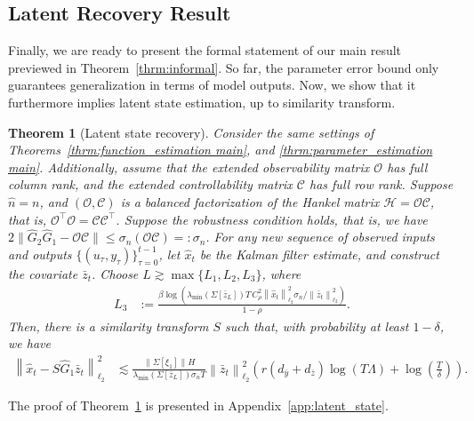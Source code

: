 \documentclass[11pt]{article}
\newtheorem{theorem}{Theorem}
\newcommand{\ybar}{\bar{y}}
\newcommand{\zbar}{\bar{z}}
\newcommand{\xtil}{\hat{x}}
\newcommand{\Ccal}{\mathcal{C}}
\newcommand{\Hcal}{\mathcal{H}}
\newcommand{\Ocal}{\mathcal{O}}
\newcommand{\tn}[1]{\left\|{#1}\right\|_{\ell_2}}
\newcommand{\norm}[1]{\|{#1} \|}
\newcommand{\T}{\top}
\newcommand{\<}{\langle}
\renewcommand{\>}{\rangle}
\numberwithin{equation}{section}
\begin{document}
\subsection{Latent Recovery Result}\label{subsec:latent}

Finally, we are ready to present the formal statement of our main result previewed in Theorem~\ref{thrm:informal}.
So far, the parameter error bound only guarantees generalization in terms of model outputs.
Now, we show that it furthermore implies latent state estimation, up to similarity transform.

\begin{theorem}[Latent state recovery]\label{thrm:latent_state main}
        Consider the same settings of Theorems~\ref{thrm:function_estimation main}, and \ref{thrm:parameter_estimation main}. Additionally, assume that the extended observability matrix $\Ocal$ has full column rank, and the extended controllability matrix $\Ccal$ has full row rank. Suppose $\hat n = n$, and $(\Ocal,\Ccal)$ is a balanced factorization of the Hankel matrix $\Hcal = \Ocal \Ccal$, that is, $\Ocal^\T \Ocal= \Ccal \Ccal^\T$. Suppose the robustness condition holds, that is, we have $2 \norm{\hat{G}_2 \hat{G}_1 - \Ocal \Ccal}\leq \sigma_{n}\left(\Ocal \Ccal\right) =: \sigma_n$. For any new sequence of observed inputs and outputs $\{(u_\tau,y_\tau)\}_{\tau = 0}^{t-1}$, let $\xtil_t$ be the Kalman filter estimate, and construct the covariate $\zbar_t$. Choose $L  \gtrsim \max \{L_1, L_2, L_3\}$, where
    \begin{align*}
        L_3 &:=\frac{\beta\log\left(\lambda_{\min}\left( \Sigma[\zbar_L]\right) T\,C_{\rho}^2\tn{\xtil_t}^2 \sigma_n/\tn{\zbar_t}^2\right)}{1-\rho}.
    \end{align*}
     Then, there is a similarity transform $S$ such that, with probability at least $1-\delta$, we have 
    \begin{align*}
      \tn{\xtil_t - S \hat{G}_1 \zbar_{t}}^2 &\lesssim  \frac{\norm{\Sigma[\xi_1]}H}{\lambda_{\min}\left( \Sigma[\zbar_L]\right) \sigma_n T} \tn{\zbar_t}^2 \left( r \left(d_{\ybar} + d_{\zbar} \right)\log \left( T\Lambda \right) + \log \left(\frac{T}{\delta}\right) \right).
    \end{align*}
\end{theorem}
The proof of Theorem~\ref{thrm:latent_state main} is presented in Appendix~\ref{app:latent_state}.
\end{document}
